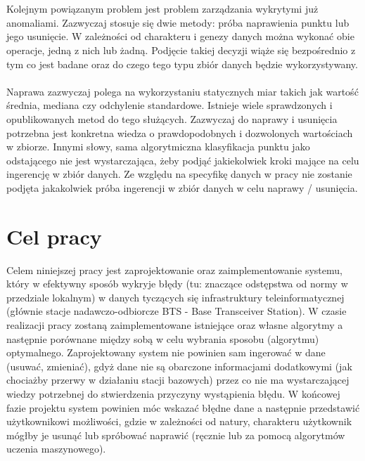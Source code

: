 \documentclass[eng,printmode]{mgr}
\begin{document}
\\ \\
Kolejnym powiązanym problem jest problem zarządzania wykrytymi już anomaliami. Zazwyczaj stosuje się dwie metody: próba naprawienia punktu lub jego usunięcie. W zależności od charakteru i genezy danych można wykonać obie operacje, jedną z nich lub żadną. Podjęcie takiej decyzji wiąże się bezpośrednio z tym co jest badane oraz do czego tego typu zbiór danych będzie wykorzystywany. 
\\ \\
Naprawa zazwyczaj polega na wykorzystaniu statycznych miar takich jak wartość średnia, mediana czy odchylenie standardowe. Istnieje wiele sprawdzonych i opublikowanych metod do tego służących.
Zazwyczaj do naprawy i usunięcia potrzebna jest konkretna wiedza o prawdopodobnych i dozwolonych wartościach w zbiorze. Innymi słowy, sama algorytmiczna klasyfikacja punktu jako odstającego nie jest wystarczająca, żeby podjąć jakiekolwiek kroki mające na celu ingerencję w zbiór danych. Ze względu na specyfikę danych w pracy nie zostanie podjęta jakakolwiek próba ingerencji w zbiór danych w celu naprawy / usunięcia.

\section{Cel pracy}
Celem niniejszej pracy jest zaprojektowanie oraz zaimplementowanie systemu, który w efektywny sposób wykryje błędy (tu: znaczące odstępstwa od normy w przedziale lokalnym) w danych tyczących się infrastruktury teleinformatycznej (głównie stacje nadawczo-odbiorcze BTS - Base Transceiver Station). W czasie realizacji pracy zostaną zaimplementowane istniejące oraz własne algorytmy a następnie porównane między sobą w celu wybrania sposobu (algorytmu) optymalnego. Zaprojektowany system nie powinien sam ingerować w dane (usuwać, zmieniać), gdyż dane nie są obarczone informacjami dodatkowymi (jak chociażby przerwy w działaniu stacji bazowych) przez co nie ma wystarczającej wiedzy potrzebnej do stwierdzenia przyczyny wystąpienia błędu. W końcowej fazie projektu system powinien móc wskazać błędne dane a następnie przedstawić użytkownikowi możliwości, gdzie w zależności od natury, charakteru użytkownik mógłby je usunąć lub spróbować naprawić (ręcznie lub za pomocą algorytmów uczenia maszynowego). 
\end{document}
